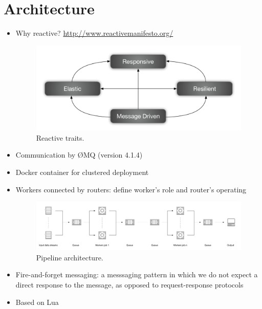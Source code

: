 \section{Architecture}
\label{sec:architecture}

\begin{itemize}
  \item Why reactive?
    \url{http://www.reactivemanifesto.org/}
    \begin{figure}[t!]
      \centering
      \includegraphics[width=.99\linewidth]{images/reactive-traits}
      \caption{Reactive traits.}
      \label{fig:reactive-traits}
    \end{figure}
  \item Communication by ØMQ (version 4.1.4)
  \item Docker container for clustered deployment
  \item Workers connected by routers: define worker's role and router's operating
    \begin{figure}[t!]
      \centering
      \includegraphics[width=.99\linewidth]{images/architecture_pipeline}
      \caption{Pipeline architecture.}
      \label{fig:architecture_pipeline}
    \end{figure}
  \item Fire-and-forget messaging: a messsaging pattern in which we do not expect a direct response to the message, as opposed to request-response protocols
  \item Based on Lua
\end{itemize}
